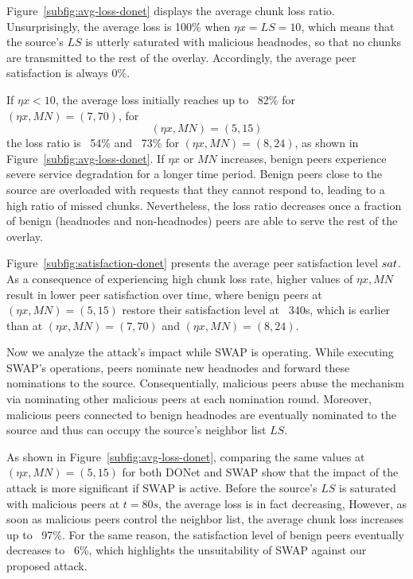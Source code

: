 Figure~\ref{subfig:avg-loss-donet} displays the average chunk loss ratio.
Unsurprisingly, the average loss is 100\% when $\eta x= LS =10$, which means that the source's $LS$ is utterly saturated with malicious headnodes, so that no chunks are transmitted to the rest of the overlay.
Accordingly, the average peer satisfaction is always 0\%. 

If $\eta x < 10$, the average loss initially reaches up to ~82\% for $(\eta x, MN)=(7, 70)$, for $$(\eta x, MN)=(5, 15)$$ the loss ratio is ~54\% and ~73\% for $(\eta x, MN)=(8, 24)$, as shown in Figure~\ref{subfig:avg-loss-donet}.
If $\eta x$ or $MN$ increases, benign peers experience severe service degradation for a longer time period. Benign peers close to the source are overloaded with requests that they cannot respond to, leading to a high ratio of missed chunks. 
Nevertheless, the loss ratio decreases once a fraction of benign (headnodes and non-headnodes) peers are able to serve the rest of the overlay.

Figure~\ref{subfig:satisfaction-donet} presents the average peer satisfaction level $sat$.
As a consequence of experiencing high chunk loss rate, higher values of $\eta x, MN$ result in lower peer satisfaction over time, where benign peers at $(\eta x, MN)=(5, 15)$ restore their satisfaction level at ~340s, which is earlier than at $(\eta x, MN)=(7, 70)$ and $(\eta x, MN)=(8, 24)$.

Now we analyze the attack's impact while SWAP is operating.
While executing SWAP's operations, peers nominate new headnodes and forward these nominations to the source. 
Consequentially, malicious peers abuse the mechanism via nominating other malicious peers at each nomination round. 
Moreover, malicious peers connected to benign headnodes are eventually nominated to the source and thus can occupy the source's neighbor list $LS$. 

As shown in Figure~\ref{subfig:avg-loss-donet}, comparing the same values at $(\eta x, MN)=(5, 15)$ for both DONet and SWAP show that the impact of the attack is more significant if SWAP is active.
Before the source's $LS$ is saturated with malicious peers at $t=80s$, the average loss is in fact decreasing, However, as soon as malicious peers control the neighbor list, the average chunk loss increases up to ~97\%. 
For the same reason, the satisfaction level of benign peers eventually decreases to ~6\%, which highlights the unsuitability of SWAP against our proposed attack.

